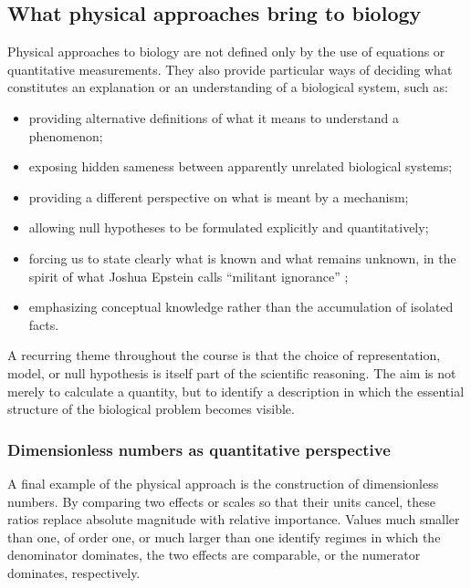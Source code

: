
\subsection{What physical approaches bring to biology}
\label{sec:ignorance}



Physical approaches to biology are not defined only by the use of equations or quantitative measurements.
They also provide particular ways of deciding what constitutes an explanation or an understanding of a biological system, such as:

\begin{itemize}
    \item providing alternative definitions of what it means to understand a phenomenon;
    \item exposing hidden sameness between apparently unrelated biological systems;
    \item providing a different perspective on what is meant by a mechanism;
    \item allowing null hypotheses to be formulated explicitly and quantitatively;
    \item forcing us to state clearly what is known and what remains unknown, in the spirit of what Joshua Epstein calls ``militant ignorance'' \cite{epstein2008};
    \item emphasizing conceptual knowledge rather than the accumulation of isolated facts.
\end{itemize}

A recurring theme throughout the course is that the choice of representation, model, or null hypothesis is itself part of the scientific reasoning.
The aim is not merely to calculate a quantity, but to identify a description in which the essential structure of the biological problem becomes visible.

\subsubsection{Dimensionless numbers as quantitative perspective}

A final example of the physical approach is the construction of dimensionless numbers.
By comparing two effects or scales so that their units cancel, these ratios replace absolute magnitude with relative importance.
Values much smaller than one, of order one, or much larger than one identify regimes in which the denominator dominates, the two effects are comparable, or the numerator dominates, respectively.

